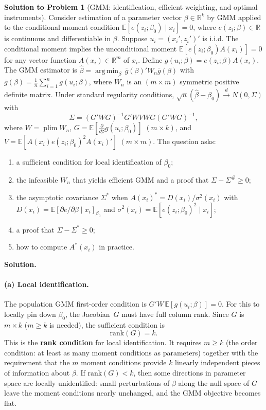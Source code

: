 \documentclass[12pt]{article}
\newcommand{\R}{\mathbb R}
\newcommand{\E}{\mathbb E}
\newcommand{\rank}{\mathrm{rank}}
\DeclareMathOperator*{\plim}{plim}
\DeclareMathOperator*{\argmin}{arg\,min}
\theoremstyle{definition}
\newtheorem{solution}{Solution to Problem}
\begin{document}
\newpage
\begin{solution}[GMM: identification, efficient weighting, and optimal instruments]
Consider estimation of a parameter vector $\beta\in\R^k$ by GMM applied to the conditional moment condition $\E[e(z_i;\beta_0)\mid x_i]=0$, where $e(z_i;\beta)\in\R$ is continuous and differentiable in $\beta$. Suppose $u_i=(x_i',z_i')'$ is i.i.d. The conditional moment implies the unconditional moment $\E[e(z_i;\beta_0)A(x_i)]=0$ for any vector function $A(x_i)\in\R^m$ of $x_i$. Define $g(u_i;\beta)=e(z_i;\beta)A(x_i)$. The GMM estimator is $\hat{\beta}=\argmin_\beta\,\bar{g}(\beta)'W_n\bar{g}(\beta)$ with $\bar{g}(\beta)=\frac{1}{n}\sum_{i=1}^n g(u_i;\beta)$, where $W_n$ is an $(m\times m)$ symmetric positive definite matrix. Under standard regularity conditions, $\sqrt{n}(\hat{\beta}-\beta_0)\xrightarrow{d}N(0,\Sigma)$ with
\[
\Sigma = (G'WG)^{-1}G'WVWG(G'WG)^{-1},
\]
where $W=\plim W_n$, $G=\E[\frac{\partial}{\partial\beta}g(u_i;\beta_0)]$ $(m\times k)$, and $V=\E[A(x_i)e(z_i;\beta_0)^2A(x_i)']$ $(m\times m)$. The question asks: 
\begin{enumerate}
    \item a sufficient condition for local identification of $\beta_0$;
    \item the infeasible $W_n$ that yields efficient GMM and a proof that $\Sigma-\Sigma^\#\geq 0$;
    \item the asymptotic covariance $\Sigma^*$ when $A(x_i)^*=D(x_i)/\sigma^2(x_i)$ with $D(x_i)=\E[\partial e/\partial\beta\mid x_i]_{\beta_0}$ and $\sigma^2(x_i)=\E[e(z_i;\beta_0)^2\mid x_i]$;
    \item a proof that $\Sigma-\Sigma^*\geq 0$;
    \item how to compute $A^*(x_i)$ in practice.
\end{enumerate}
\medskip
\noindent\textbf{Solution.}
\paragraph{(a) Local identification.} The population GMM first-order condition is $G'W\,\E[g(u_i;\beta)]=0$. For this to locally pin down $\beta_0$, the Jacobian~$G$ must have full column rank. Since $G$ is $m\times k$ ($m\geq k$ is needed), the sufficient condition is
\[
\boxed{\rank(G)=k.}
\]
This is the \textbf{rank condition} for local identification. It requires $m\geq k$ (the order condition: at least as many moment conditions as parameters) together with the requirement that the $m$ moment conditions provide $k$ linearly independent pieces of information about $\beta$. If $\rank(G)<k$, then some directions in parameter space are locally unidentified: small perturbations of $\beta$ along the null space of $G$ leave the moment conditions nearly unchanged, and the GMM objective becomes flat.


\end{solution}
\end{document}
